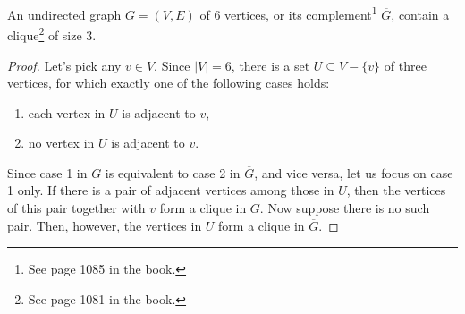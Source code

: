 \subproblem
\begin{theorem}
    An undirected graph $G=(V,E)$ of 6 vertices, or its complement\footnote{See page 1085 in the book.} $\overline{G}$, contain a clique\footnote{See page 1081 in the book.} of size 3.
\end{theorem}

\begin{proof}
    Let's pick any $v\in V$.
    Since $|V|=6$, there is a set $U\subseteq V-\{v\}$ of three vertices, for which exactly one of the following cases holds:
    \begin{enumerate}
        \item each vertex in $U$ is adjacent to $v$,
        \item no vertex in $U$ is adjacent to $v$.
    \end{enumerate}
    Since case 1 in $G$ is equivalent to case 2 in $\overline{G}$, and vice versa, let us focus on case 1 only.
    If there is a pair of adjacent vertices among those in $U$, then the vertices of this pair together with $v$ form a clique in $G$.
    Now suppose there is no such pair.
    Then, however, the vertices in $U$ form a clique in $\overline{G}$.
\end{proof}
